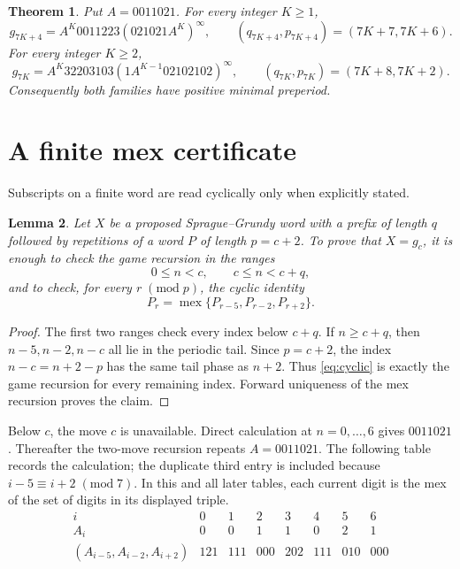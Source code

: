 \documentclass[11pt]{article}
\newtheorem{theorem}{Theorem}
\newtheorem{lemma}[theorem]{Lemma}
\newcommand{\mex}{\operatorname{mex}}
\begin{document}
\begin{theorem}\label{thm:main}
Put $A=0011021$.  For every integer $K\ge1$,
\[
 g_{7K+4}=A^K0011223(021021A^K)^\infty,
 \qquad (q_{7K+4},p_{7K+4})=(7K+7,7K+6).
\]
For every integer $K\ge2$,
\[
 g_{7K}=A^K32203103(1A^{K-1}02102102)^\infty,
 \qquad (q_{7K},p_{7K})=(7K+8,7K+2).
\]
Consequently both families have positive minimal preperiod.
\end{theorem}

\section{A finite mex certificate}

Subscripts on a finite word are read cyclically only when explicitly stated.

\begin{lemma}\label{lem:certificate}
Let $X$ be a proposed Sprague--Grundy word with a prefix of length $q$
followed by repetitions of a word $P$ of length $p=c+2$.  To prove that
$X=g_c$, it is enough to check the game recursion in the ranges
\[
 0\le n<c,\qquad c\le n<c+q,
\]
and to check, for every $r\;(\mathrm{mod}\;p)$, the cyclic identity
\begin{equation}\label{eq:cyclic}
 P_r=\mex\{P_{r-5},P_{r-2},P_{r+2}\}.
\end{equation}
\end{lemma}

\begin{proof}
The first two ranges check every index below $c+q$.  If $n\ge c+q$, then
$n-5,n-2,n-c$ all lie in the periodic tail.  Since $p=c+2$, the index
$n-c=n+2-p$ has the same tail phase as $n+2$.  Thus
\eqref{eq:cyclic} is exactly the game recursion for every remaining index.
Forward uniqueness of the mex recursion proves the claim.
\end{proof}

Below $c$, the move $c$ is unavailable.  Direct calculation at
$n=0,\ldots,6$ gives $0011021$.  Thereafter the two-move recursion repeats
$A=0011021$.  The following table records the calculation; the duplicate
third entry is included because $i-5\equiv i+2\;(\mathrm{mod}\;7)$.  In this and all
later tables, each current digit is the mex of the set of digits in its
displayed triple.
\begin{equation}\label{eq:base}
\begin{array}{c|ccccccc}
i&0&1&2&3&4&5&6\\ \hline
A_i&0&0&1&1&0&2&1\\
(A_{i-5},A_{i-2},A_{i+2})&121&111&000&202&111&010&000
\end{array}
\end{equation}
\end{document}
